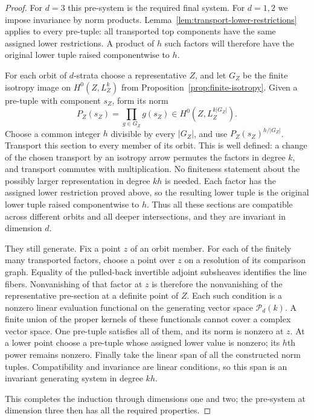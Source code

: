 \begin{proof}
For \(d=3\) this pre-system is the required final system.  For \(d=1,2\)
we impose invariance by norm products.  Lemma~\ref{lem:transport-lower-restrictions}
applies to every pre-tuple: all transported top components have the same
assigned lower restrictions.  A product of \(h\) such factors will
therefore have the original lower tuple raised componentwise to \(h\).

For each orbit of \(d\)-strata choose a representative \(Z\), and let
\(G_Z\) be the finite isotropy image on \(H^0(Z,L_Z^k)\) from
Proposition~\ref{prop:finite-isotropy}.  Given a pre-tuple with component
\(s_Z\), form its norm
\[
 P_Z(s_Z)=\prod_{g\in G_Z}g(s_Z)
 \in H^0(Z,L_Z^{k|G_Z|}).
\]
Choose a common integer \(h\) divisible by every \(|G_Z|\), and use
\(P_Z(s_Z)^{h/|G_Z|}\).  Transport this section to every member of its
orbit.  This is well defined: a change of the chosen transport by an
isotropy arrow permutes the factors in degree \(k\), and transport
commutes with multiplication.  No finiteness statement about the
possibly larger representation in degree \(kh\) is needed.  Each factor
has the assigned lower restriction proved above, so the resulting lower
tuple is the original lower tuple raised componentwise to \(h\).
Thus all these sections are compatible across different orbits and all
deeper intersections, and they are invariant in dimension \(d\).

They still generate.  Fix a point \(z\) of an orbit member.  For each of
the finitely many transported factors, choose a point over \(z\) on a
resolution of its comparison graph.  Equality of the pulled-back
invertible adjoint subsheaves identifies the line fibers.  Nonvanishing
of that factor at \(z\) is therefore the nonvanishing of the representative
pre-section at a definite point of \(Z\).  Each such condition is a
nonzero linear evaluation functional on the generating vector space
\(\mathcal P_d(k)\).  A finite union of the proper kernels of these
functionals cannot cover a complex vector space.  One pre-tuple satisfies
all of them, and its norm is nonzero at \(z\).  At a lower point choose
a pre-tuple whose assigned lower value is nonzero; its \(h\)th power
remains nonzero.  Finally take the linear span of all the constructed
norm tuples.  Compatibility and invariance are linear conditions, so this
span is an invariant generating system in degree \(kh\).

This completes the induction through dimensions one and two; the
pre-system at dimension three then has all the required properties.
\end{proof}

